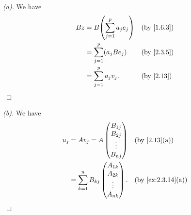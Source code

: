 \begin{proof}[(a)]
  We have
  \begin{align*}
    Bz & = B \pa{\sum_{j = 1}^p a_j e_j} &  & \by{1.6.3} \\
       & = \sum_{j = 1}^p (a_j B e_j)    &  & \by{2.3.5} \\
       & = \sum_{j = 1}^p a_j v_j.       &  & \by{2.13}
  \end{align*}
\end{proof}

\begin{proof}[(b)]
  We have
  \begin{align*}
    u_j & = A v_j = A \begin{pmatrix}
                        B_{1 j} \\
                        B_{2 j} \\
                        \vdots  \\
                        B_{n j}
                      \end{pmatrix}              &  & \by{2.13}[a]       \\
        & = \sum_{k = 1}^n B_{k j} \begin{pmatrix}
                                     A_{1 k} \\
                                     A_{2 k} \\
                                     \vdots  \\
                                     A_{n k}
                                   \end{pmatrix}. &  & \by{ex:2.3.14}[a]
  \end{align*}
\end{proof}

